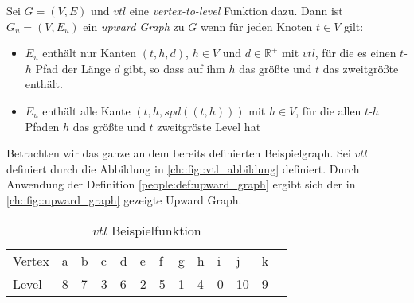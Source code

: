 \begin{definition}\label{people:def:upward_graph}
    Sei $G = (V, E)$ und ${vtl}$ eine \emph{vertex-to-level} Funktion dazu. Dann ist $G_u = (V, E_u)$ ein \emph{upward Graph} zu $G$ wenn für jeden Knoten $t \in V$ gilt:

    \begin{itemize}
        \item
              $E_u$ enthält nur Kanten $(t, h, d)$, $h \in V$ und $d \in \mathbb{R}^+$ mit ${vtl}$, für die es einen $t$-$h$ Pfad der Länge $d$ gibt, so dass auf ihm $h$ das größte und $t$ das zweitgrößte enthält.

        \item
              $E_u$ enthält alle Kante $(t, h, {spd}((t, h)))$ mit $h \in V$, für die allen $t$-$h$ Pfaden $h$ das größte und $t$ zweitgröste Level hat
    \end{itemize}
\end{definition}

Betrachten wir das ganze an dem bereits definierten Beispielgraph.
Sei ${vtl}$ definiert durch die Abbildung in \autoref{ch::fig::vtl_abbildung} definiert.
Durch Anwendung der Definition \ref{people:def:upward_graph} ergibt sich der in \autoref{ch::fig::upward_graph} gezeigte Upward Graph.

\begin{table}[ht]
    \centering
    \begin{tabular}{lllllllllllll}
        Vertex & a & b & c & d & e & f & g & h & i & j  & k & \\
        Level  & 8 & 7 & 3 & 6 & 2 & 5 & 1 & 4 & 0 & 10 & 9 &
    \end{tabular}
    \caption{${vtl}$ Beispielfunktion}
    \label{ch::fig::vtl_abbildung}
\end{table}


